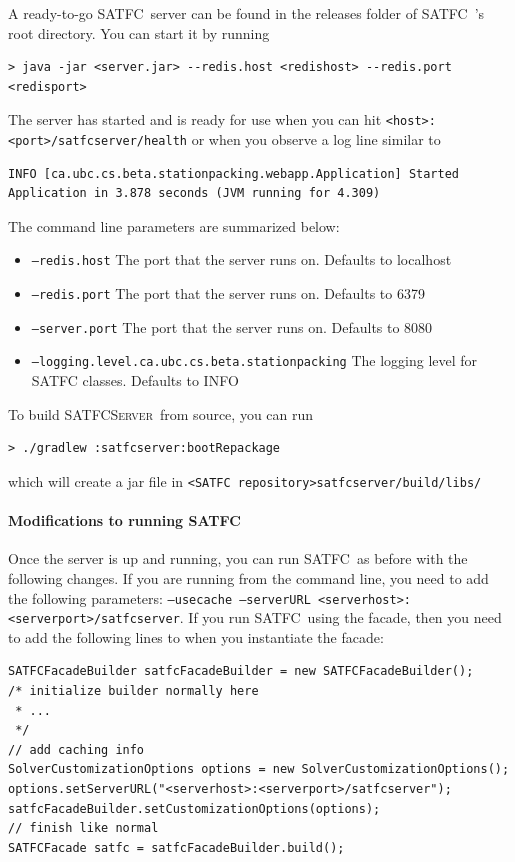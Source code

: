 \documentclass[
10pt, %
letterpaper, %
oneside, %
headinclude,footinclude, %
BCOR5mm, %
needspace, %
]{scrartcl}
\newcommand{\SATFC}{\textsc{SATFC}~}
\newcommand{\SATFCServer}{\textsc{SATFCServer}~}
\begin{document}
A ready-to-go \SATFC server can be found in the releases folder of \SATFC's root directory. You can start it by running
\begin{lstlisting}[style=Bash]
> java -jar <server.jar> --redis.host <redishost> --redis.port <redisport>
\end{lstlisting}
The server has started and is ready for use when you can hit \texttt{<host>:<port>/satfcserver/health} or when you observe a log line similar to 
\begin{lstlisting}[style=Bash]
INFO [ca.ubc.cs.beta.stationpacking.webapp.Application] Started Application in 3.878 seconds (JVM running for 4.309)
\end{lstlisting}
The command line parameters are summarized below:
\begin{itemize}
\item \texttt{---redis.host} The port that the server runs on. Defaults to localhost
\item \texttt{---redis.port} The port that the server runs on. Defaults to 6379
\item \texttt{---server.port} The port that the server runs on. Defaults to 8080
\item \texttt{---logging.level.ca.ubc.cs.beta.stationpacking} The logging level for SATFC classes. Defaults to INFO
\end{itemize}
To build \SATFCServer from source, you can run 
\begin{lstlisting}[style=Bash]
> ./gradlew :satfcserver:bootRepackage
\end{lstlisting}
which will create a jar file in \texttt{<SATFC repository>satfcserver/build/libs/}

\paragraph{Modifications to running \SATFC}
Once the server is up and running, you can run \SATFC as before with the following changes. If you are running from the command line, you need to add the following parameters: \texttt{---usecache ---serverURL <serverhost>:<serverport>/satfcserver}. If you run \SATFC using the facade, then you need to add the following lines to when you instantiate the facade:

\begin{verbatim}
SATFCFacadeBuilder satfcFacadeBuilder = new SATFCFacadeBuilder();
/* initialize builder normally here
 * ...
 */
// add caching info
SolverCustomizationOptions options = new SolverCustomizationOptions();
options.setServerURL("<serverhost>:<serverport>/satfcserver");
satfcFacadeBuilder.setCustomizationOptions(options);
// finish like normal
SATFCFacade satfc = satfcFacadeBuilder.build();
\end{verbatim}
\end{document}
